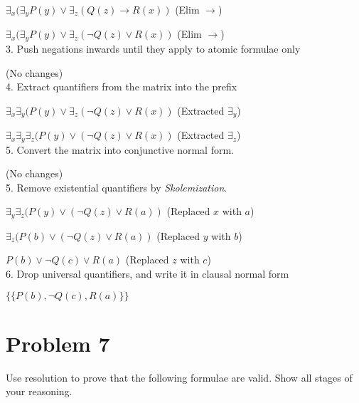 \documentclass{article}
\newcommand{\tOne}{7.5cm}
\begin{document}
{$\exists_x(\exists_yP(y) \vee \exists_z(Q(z) \rightarrow R(x))$ \tabto{\tOne}(Elim $\rightarrow$)

$\exists_x(\exists_yP(y) \vee \exists_z(\neg{Q(z)} \vee R(x))$ \tabto{\tOne}(Elim $\rightarrow$)\\

3. Push negations inwards until they apply to atomic formulae only

(No changes)\\

4. Extract quantifiers from the matrix into the prefix

$\exists_x\exists_y(P(y) \vee \exists_z(\neg{Q(z)} \vee R(x))$ \tabto{\tOne}(Extracted $\exists_y$)

$\exists_x\exists_y\exists_z(P(y) \vee (\neg{Q(z)} \vee R(x))$ \tabto{\tOne}(Extracted $\exists_z$)\\

5. Convert the matrix into conjunctive normal form.

(No changes)\\

5. Remove existential quantifiers by \emph{Skolemization}.

$\exists_y\exists_z(P(y) \vee (\neg{Q(z)} \vee R(a))$ \tabto{\tOne}(Replaced $x$ with $a$)

$\exists_z(P(b) \vee (\neg{Q(z)} \vee R(a))$ \tabto{\tOne}(Replaced $y$ with $b$)

$P(b) \vee \neg{Q(c)} \vee R(a)$ \tabto{\tOne}(Replaced $z$ with $c$)\\

6. Drop universal quantifiers, and write it in clausal normal form

$\{\{P(b), \neg{Q(c)}, R(a)\}\}$

\pagebreak

\pagebreak
\section*{Problem 7}

Use resolution to prove that the following formulae are valid. Show all stages of your reasoning.

}
\end{document}
